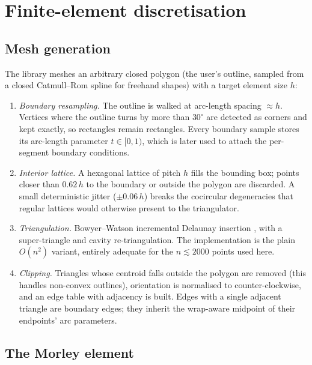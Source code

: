 \documentclass[11pt,a4paper]{article}
\begin{document}
\section{Finite-element discretisation}
\label{sec:fem}

\subsection{Mesh generation}
\label{sec:mesh}

The library meshes an arbitrary closed polygon (the user's outline, sampled
from a closed Catmull--Rom spline \cite{catmull} for freehand shapes) with a
target element size $h$:
%
\begin{enumerate}
\item \emph{Boundary resampling.} The outline is walked at arc-length
  spacing $\approx h$. Vertices where the outline turns by more than
  $30^\circ$ are detected as corners and kept exactly, so rectangles remain
  rectangles. Every boundary sample stores its arc-length parameter
  $t\in[0,1)$, which is later used to attach the per-segment boundary
  conditions.
\item \emph{Interior lattice.} A hexagonal lattice of pitch $h$ fills the
  bounding box; points closer than $0.62\,h$ to the boundary or outside the
  polygon are discarded. A small deterministic jitter ($\pm 0.06\,h$)
  breaks the cocircular degeneracies that regular lattices would otherwise
  present to the triangulator.
\item \emph{Triangulation.} Bowyer--Watson incremental Delaunay insertion
  \cite{bowyer,watson}, with a super-triangle and cavity re-triangulation.
  The implementation is the plain $O(n^2)$ variant, entirely adequate for
  the $n \lesssim 2000$ points used here.
\item \emph{Clipping.} Triangles whose centroid falls outside the polygon
  are removed (this handles non-convex outlines), orientation is normalised
  to counter-clockwise, and an edge table with adjacency is built. Edges
  with a single adjacent triangle are boundary edges; they inherit the
  wrap-aware midpoint of their endpoints' arc parameters.
\end{enumerate}

\subsection{The Morley element}
\label{sec:morley}
\end{document}
